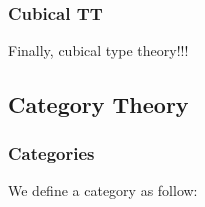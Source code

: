 \begin{code}[hide]%
\>[0]\AgdaSymbol{\{-\#}\AgdaSpace{}%
\AgdaSpace{}%
\AgdaSpace{}%
\AgdaSymbol{\#-\}}\<%
\\
\>[0]\AgdaSpace{}%
\AgdaSpace{}%
\<%
\end{code}

\subsubsection*{Cubical TT}

Finally, cubical type theory!!!

\subsection{Category Theory}

\subsubsection*{Categories}

We define a category as follow:

